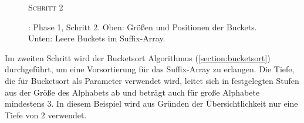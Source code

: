 \begin{figure}[ht]
    {\centering\begin{minipage}{\textwidth}
        {\large \textsc{Schritt 2}}\par\medskip
        \par\medskip
    \end{minipage}}
    \caption[\bpr: Phase 1, Schritt 2]{\bpr: Phase 1, Schritt 2. Oben: Größen und Positionen der Buckets. Unten: Leere Buckets im Suffix-Array.}
    \label{bpr:p1s2}
\end{figure}
Im zweiten Schritt wird der Bucketsort Algorithmus (\cref{section:bucketsort}) durchgeführt, um eine Vorsortierung für das Suffix-Array zu erlangen. Die Tiefe, die für Bucketsort als Parameter verwendet wird, leitet sich in festgelegten Stufen aus der Größe des Alphabets ab und beträgt auch für große Alphabete mindestens 3. In diesem Beispiel wird aus Gründen der Übersichtlichkeit nur eine Tiefe von 2 verwendet.\par
